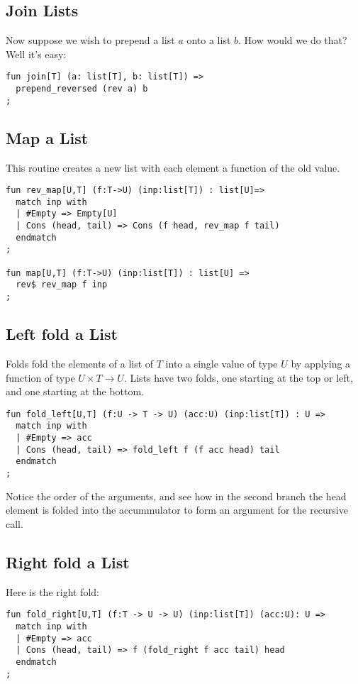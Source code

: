 \documentclass[oneside]{book}
\begin{document}
\subsection{Join Lists}
Now suppose we wish to prepend a list $a$ onto a list $b$.
How would we do that? Well it's easy:

\begin{verbatim}
fun join[T] (a: list[T], b: list[T]) =>
  prepend_reversed (rev a) b
;
\end{verbatim}

\subsection{Map a List}
This routine creates a new list with each
element a function of the old value.

\begin{verbatim}
fun rev_map[U,T] (f:T->U) (inp:list[T]) : list[U]=>
  match inp with
  | #Empty => Empty[U]
  | Cons (head, tail) => Cons (f head, rev_map f tail)
  endmatch
;

fun map[U,T] (f:T->U) (inp:list[T]) : list[U] =>
  rev$ rev_map f inp
;
\end{verbatim}

\subsection{Left fold a List}
Folds fold the elements of a list of $T$ into a single value
of type $U$ by applying a function of type $U \times T \rightarrow U$.
Lists have two folds, one starting at the top or left, and one starting
at the bottom.

\begin{verbatim}
fun fold_left[U,T] (f:U -> T -> U) (acc:U) (inp:list[T]) : U =>
  match inp with
  | #Empty => acc
  | Cons (head, tail) => fold_left f (f acc head) tail
  endmatch
;
\end{verbatim}

Notice the order of the arguments, and see how in the second branch
the head element is folded into the accummulator to form an argument
for the recursive call.

\subsection{Right fold a List}
Here is the right fold:

\begin{verbatim}
fun fold_right[U,T] (f:T -> U -> U) (inp:list[T]) (acc:U): U =>
  match inp with
  | #Empty => acc
  | Cons (head, tail) => f (fold_right f acc tail) head
  endmatch
;
\end{verbatim}
\end{document}

